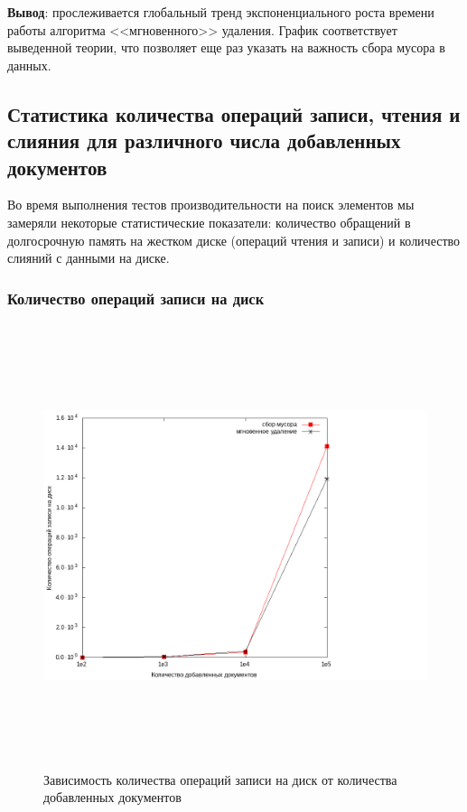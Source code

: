\textbf{Вывод}: прослеживается глобальный тренд экспоненциального роста времени
работы алгоритма <<мгновенного>> удаления. График соответствует выведенной теории,
что позволяет еще раз указать на важность сбора мусора в данных.

\newpage
\subsection{Статистика количества операций записи, чтения и слияния для различного числа добавленных документов}

Во время выполнения тестов производительности на поиск элементов мы замеряли
некоторые статистические показатели: количество обращений в долгосрочную память
на жестком диске (операций чтения и записи) и количество слияний с данными на
диске.
\subsubsection{Количество операций записи на диск}

\begin{figure}[H]
\includegraphics[width=22cm, height=13cm]{fig/writecalls.png}
\caption{Зависимость количества операций записи на диск от количества добавленных документов}
\end{figure}

